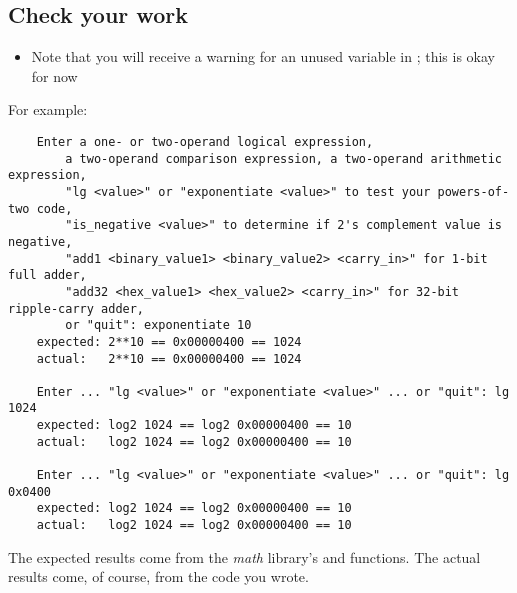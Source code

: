 \begin{description}
\end{description}


\subsection*{Check your work}

\begin{description}
    \begin{itemize}
        \item Note that you will receive a warning for an unused variable in ;
            this is okay for now
    \end{itemize}
\end{description}
For example:
\begin{verbatim}
    Enter a one- or two-operand logical expression,
        a two-operand comparison expression, a two-operand arithmetic expression,
        "lg <value>" or "exponentiate <value>" to test your powers-of-two code,
        "is_negative <value>" to determine if 2's complement value is negative,
        "add1 <binary_value1> <binary_value2> <carry_in>" for 1-bit full adder,
        "add32 <hex_value1> <hex_value2> <carry_in>" for 32-bit ripple-carry adder,
        or "quit": exponentiate 10
    expected: 2**10 == 0x00000400 == 1024
    actual:   2**10 == 0x00000400 == 1024

    Enter ... "lg <value>" or "exponentiate <value>" ... or "quit": lg 1024
    expected: log2 1024 == log2 0x00000400 == 10
    actual:   log2 1024 == log2 0x00000400 == 10

    Enter ... "lg <value>" or "exponentiate <value>" ... or "quit": lg 0x0400
    expected: log2 1024 == log2 0x00000400 == 10
    actual:   log2 1024 == log2 0x00000400 == 10
\end{verbatim}

The expected results come from the \textit{math} library's  and  functions.
The actual results come, of course, from the code you wrote.

\begin{description}
\end{description}


